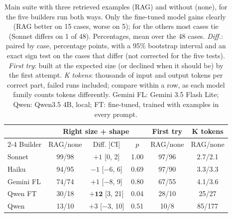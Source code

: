 \begin{table}[t]
  \centering
  \small
  \setlength{\tabcolsep}{2pt}
  \begin{tabular}{@{}lccccc@{}}
    \toprule
    & \multicolumn{3}{c}{Right size + shape} & First try & K tokens \\
    \cmidrule(lr){2-4}
    Builder & RAG/none & Diff. [CI] & $p$ & RAG/none & RAG/none \\
    \midrule
    Sonnet& 99/98 & $+1$ [0, 2]               & 1.00 & 97/96 & 2.7/2.1 \\
    Haiku& 94/95 & $-1$ [$-6$, 6]            & 0.69 & 97/90 & 3.3/3.3 \\
    Gemini FL& 74/74 & $+1$ [$-8$, 9]            & 0.80 & 67/55 & 4.1/3.6 \\
    Qwen FT& 30/18 & $\mathbf{+12}$ [3, 21]    & 0.04 & 28/10 & 25/27 \\
    Qwen& 13/10 & $+3$ [$-3$, 10]           & 0.51 & 10/8  & 85/177 \\
    \bottomrule
  \end{tabular}
  \caption{Main suite with three retrieved examples (RAG) and without (none), for the five builders run both ways.
    Only the fine-tuned model gains clearly (RAG better on 15 cases, worse on 5); for the others most cases tie
    (Sonnet differs on 1 of 48). Percentages, mean over the 48 cases. \emph{Diff.}: paired by case, percentage points, with a 95\% bootstrap
    interval and an exact sign test on the cases that differ (not corrected for the five tests). \emph{First try}: built at the expected size (or declined when it should be)
    by the first attempt. \emph{K tokens}: thousands of input and output tokens per correct part, failed runs included; compare
    within a row, as each model family counts tokens differently. Gemini FL: Gemini 3.5 Flash Lite; Qwen: Qwen3.5 4B, local;
    FT: fine-tuned, trained with examples in every prompt.}
  \label{tab:rag}
\end{table}

